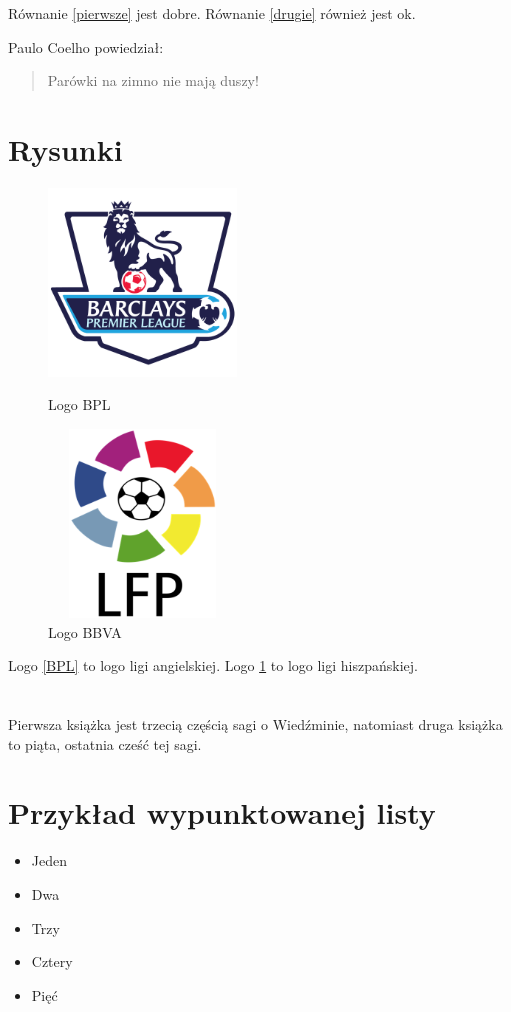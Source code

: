 \documentclass[12pt]{article}
\begin{document}
Równanie \ref{pierwsze} jest dobre.
Równanie \ref{drugie} również jest ok.


\vspace{5mm}
Paulo Coelho powiedział:
\begin{quote}
 Parówki na zimno nie mają duszy!
\end{quote}


\newpage

\section{Rysunki}
\begin{figure}[ht]
\begin{center}
\includegraphics[width=5cm,height=5cm,keepaspectratio]{BPLlogo.png}
\caption{Logo BPL}
\label{BPL}

\includegraphics[width=5cm,height=5cm,keepaspectratio]{BBVAlogo.png}
\caption{Logo BBVA}
\label{BBVA}
\end{center}
\end{figure}

Logo \ref{BPL} to logo ligi angielskiej.
Logo \ref{BBVA} to logo ligi hiszpańskiej.
\section*{}
Pierwsza książka \cite{saga3} jest trzecią częścią sagi o Wiedźminie, natomiast druga książka \cite{saga5} to piąta, ostatnia cześć tej sagi.

\newpage

\section{Przykład wypunktowanej listy}
\begin{itemize}
\item Jeden
\item Dwa
\item Trzy
\item Cztery
\item Pięć
\end{itemize}
\end{document}
